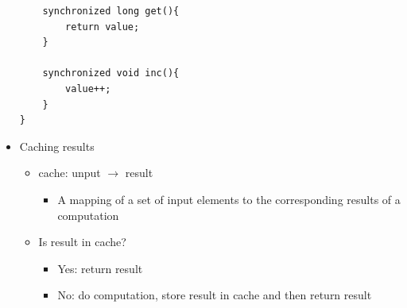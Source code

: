 \documentclass[a4paper]{article}
\begin{document}
\begin{itemize}
\begin{lstlisting}
	synchronized long get(){
		return value;
	}

	synchronized void inc(){
		value++;
	}
}
 			\end{lstlisting}
 			\item Caching results
 				\begin{itemize}
 					\item cache: unput $\to$ result
 						\begin{itemize}
 							\item A mapping of a set of input elements to the corresponding results of a computation
 						\end{itemize}
 					\item Is result in cache?
 						\begin{itemize}
 							\item Yes: return result
 							\item No: do computation, store result in cache and then return result
 						\end{itemize}
 				\end{itemize}
	\end{itemize}
\end{document}

